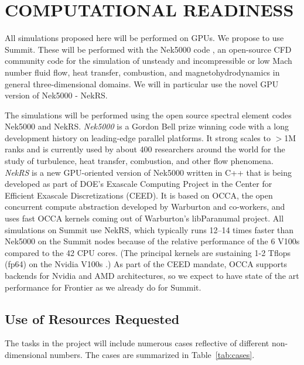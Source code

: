 \vspace{-.25in}
\section{COMPUTATIONAL READINESS} %
\vspace{-.2in}

All simulations proposed here will be performed on GPUs. We propose to use
Summit.  These will be performed with the Nek5000 code
\cite{argonne:nekdoc}, an open-source CFD  community code for the simulation of
unsteady and incompressible or low Mach number fluid flow, heat transfer,
combustion, and magnetohydrodynamics in general three-dimensional domains. We
will in particular use the novel GPU version of Nek5000 - NekRS.

The simulations will be performed using the open source spectral element codes
Nek5000 and NekRS.   {\em Nek5000} is a Gordon Bell prize winning code with a
long development history on leading-edge parallel platforms.  It strong scales
to $>$1M ranks \cite{fischer15} and is currently used by about 400 researchers
around the world for the study of turbulence, heat transfer, combustion, and
other flow phenomena.  {\em NekRS} is a new GPU-oriented version of Nek5000
written in C++ that is being developed as part of DOE's Exascale Computing
Project in the Center for Efficient Exascale Discretizations (CEED).  It is
based on OCCA, the open concurrent compute abstraction developed by Warburton
and co-workers, and uses fast OCCA kernels coming out of Warburton's
libParanumal project.  All simulations on Summit use NekRS, which typically
runs 12--14 times faster than Nek5000 on the Summit nodes because of the
relative performance of the 6 V100s compared to the 42 CPU cores.  (The
principal kernels are sustaining 1-2 Tflops (fp64) on the Nvidia V100s
\cite{fischer20a,warburton2019}.) As part of the CEED mandate, OCCA supports
backends for Nvidia and AMD architectures, so we expect to have state of the
art performance for Frontier as we already do for Summit.

\vspace{-.25in}
\subsection{Use of Resources Requested}
\vspace{-.2in}

The tasks in the project will include numerous cases reflective of different
non-dimensional numbers. The cases are summarized in Table~\ref{tab:cases}.

